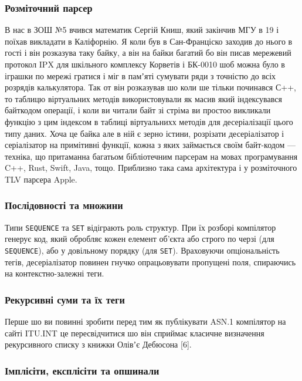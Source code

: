 \subsubsection{Розміточний парсер}

В нас в ЗОШ №5 вчився математик Сергій Книш, який закінчив МГУ в 19 і поїхав викладати в Каліфорнію. Я коли був в Сан-Франціско заходив до нього в гості і він розказува таку байку, а він на байки багатий бо він писав мережевий протокол IPX для шкільного комплексу Корветів і БК-0010 шоб можна було в іграшки по мережі гратися і міг в памʼяті сумувати ряди з точністю до всіх розрядів калькулятора. Так от він розказував шо коли ше тільки починався С++, то таблицю віртуальних методів використовували як масив який індексувався байткодом операції, і коли ви читали байт зі стріма ви простоо викликали функцію з цим індексом в таблиці віртуальнихх методів для десеріалізації цього типу даних. Хоча це байка але в ній є зерно істини, розрізати десеріалізатор і серіалізатор на примітивні функції, кожна з яких займається своїм байт-кодом — техніка, що притаманна багатьом бібліотечним парсерам на мовах програмування C++, Rust, Swift, Java, тощо. Приблизно така сама архітектура і у розміточного TLV парсера Apple.

\subsubsection{Послідовності та множини}

Типи \texttt{SEQUENCE} та \texttt{SET} відіграють роль структур. При їх розборі компілятор генерує код, який обробляє кожен елемент об'єкта або строго по черзі (для \texttt{SEQUENCE}), або у довільному порядку (для \texttt{SET}). Враховуючи опціональність тегів, десеріалізатор повинен гнучко опрацьовувати пропущені поля, спираючись на контекстно-залежні теги.

\subsubsection{Рекурсивні суми та їх теги}

Перше шо ви повинні зробити перед тим як публікувати ASN.1 компілятор на сайті ITU.INT це пересвідчитися шо він сприймає класичне визначення рекурсивного списку з книжки Олівʼє Дебюсона [6].

\subsubsection{Імплісіти, експлісіти та опшинали}

